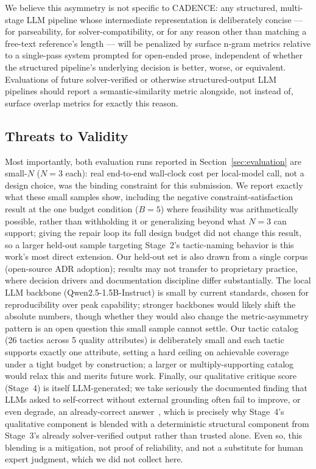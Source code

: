 \documentclass[preprint,12pt,authoryear]{elsarticle}
\renewcommand{\_}{\textunderscore\allowbreak{}}
\begin{document}
We believe this asymmetry is not specific to CADENCE: any structured, multi-stage LLM pipeline whose intermediate representation is deliberately concise --- for parseability, for solver-compatibility, or for any reason other than matching a free-text reference's length --- will be penalized by surface n-gram metrics relative to a single-pass system prompted for open-ended prose, independent of whether the structured pipeline's underlying decision is better, worse, or equivalent. Evaluations of future solver-verified or otherwise structured-output LLM pipelines should report a semantic-similarity metric alongside, not instead of, surface overlap metrics for exactly this reason.

\subsection{Threats to Validity}

Most importantly, both evaluation runs reported in Section~\ref{sec:evaluation} are small-$N$ ($N=3$ each): real end-to-end wall-clock cost per local-model call, not a design choice, was the binding constraint for this submission. We report exactly what these small samples show, including the negative constraint-satisfaction result at the one budget condition ($B=5$) where feasibility was arithmetically possible, rather than withholding it or generalizing beyond what $N=3$ can support; giving the repair loop its full design budget did not change this result, so a larger held-out sample targeting Stage~2's tactic-naming behavior is this work's most direct extension. Our held-out set is also drawn from a single corpus (open-source ADR adoption); results may not transfer to proprietary practice, where decision drivers and documentation discipline differ substantially. The local LLM backbone (Qwen2.5-1.5B-Instruct) is small by current standards, chosen for reproducibility over peak capability; stronger backbones would likely shift the absolute numbers, though whether they would also change the metric-asymmetry pattern is an open question this small sample cannot settle. Our tactic catalog (26 tactics across 5 quality attributes) is deliberately small and each tactic supports exactly one attribute, setting a hard ceiling on achievable coverage under a tight budget by construction; a larger or multiply-supporting catalog would relax this and merits future work. Finally, our qualitative critique score (Stage~4) is itself LLM-generated; we take seriously the documented finding that LLMs asked to self-correct without external grounding often fail to improve, or even degrade, an already-correct answer~\citep{huang2024selfcorrect}, which is precisely why Stage~4's qualitative component is blended with a deterministic structural component from Stage~3's already solver-verified output rather than trusted alone. Even so, this blending is a mitigation, not proof of reliability, and not a substitute for human expert judgment, which we did not collect here.
\end{document}
